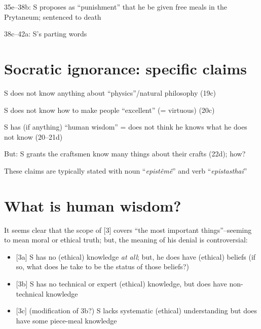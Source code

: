 \documentclass[11pt]{article}
\begin{document}
\noindent 35e--38b: S proposes as ``punishment'' that he be given free meals in the Prytaneum; sentenced to death
\vspace*{2mm}

\noindent 38c--42a: S's parting words

\vspace*{-3mm}
\section*{Socratic ignorance: specific claims}

\noindent [1] S does not know anything about ``physics''/natural philosophy (19c)
\vspace*{2mm}

\noindent [2] S does not know how to make people ``excellent'' (= virtuous) (20c)
\vspace*{2mm}

\noindent [3] S has (if anything) ``human wisdom'' = does not think he knows what he does not know (20--21d)
\vspace*{2mm}

\noindent [4] But: S grants the craftsmen know many things about their crafts (22d); how?
\vspace*{2mm}

\noindent These claims are typically stated with noun ``\emph{epist\^{e}m\^{e}}'' and verb ``\emph{epistasthai}''
\vspace*{-3mm}

\section*{What is human wisdom?}

\noindent It seems clear that the scope of [3] covers ``the most important things''--seeming to mean moral or ethical truth; but, the meaning of his denial is controversial:\begin{itemize}\item{[3a] S has no (ethical) knowledge \emph{at all}; but, he does have (ethical) beliefs (if so, what does he take to be the status of those beliefs?)}\item{[3b] S has no technical or expert (ethical) knowledge, but does have non-technical knowledge}\item{[3c] (modification of 3b?) S lacks systematic (ethical) understanding but does have some piece-meal knowledge}\end{itemize}
\vspace*{2mm}
\end{document}
